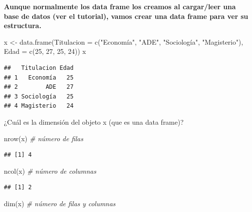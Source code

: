 \documentclass[
]{book}
\newenvironment{Shaded}{\begin{snugshade}}{\end{snugshade}}
\newcommand{\AttributeTok}[1]{\textcolor[rgb]{0.77,0.63,0.00}{#1}}
\newcommand{\CommentTok}[1]{\textcolor[rgb]{0.56,0.35,0.01}{\textit{#1}}}
\newcommand{\DecValTok}[1]{\textcolor[rgb]{0.00,0.00,0.81}{#1}}
\newcommand{\FunctionTok}[1]{\textcolor[rgb]{0.00,0.00,0.00}{#1}}
\newcommand{\NormalTok}[1]{#1}
\newcommand{\OtherTok}[1]{\textcolor[rgb]{0.56,0.35,0.01}{#1}}
\newcommand{\StringTok}[1]{\textcolor[rgb]{0.31,0.60,0.02}{#1}}
\begin{document}
\textbf{Aunque normalmente los data frame los creamos al cargar/leer una base de datos (ver el tutorial), vamos crear una data frame para ver su estructura.}

\begin{Shaded}
\begin{Highlighting}[]
\NormalTok{x }\OtherTok{\textless{}{-}} \FunctionTok{data.frame}\NormalTok{(}\AttributeTok{Titulacion =} \FunctionTok{c}\NormalTok{(}\StringTok{"Economía"}\NormalTok{, }\StringTok{"ADE"}\NormalTok{, }\StringTok{"Sociología"}\NormalTok{, }\StringTok{"Magisterio"}\NormalTok{), }\AttributeTok{Edad =} \FunctionTok{c}\NormalTok{(}\DecValTok{25}\NormalTok{, }\DecValTok{27}\NormalTok{, }\DecValTok{25}\NormalTok{, }\DecValTok{24}\NormalTok{))}
\NormalTok{x}
\end{Highlighting}
\end{Shaded}

\begin{verbatim}
##   Titulacion Edad
## 1   Economía   25
## 2        ADE   27
## 3 Sociología   25
## 4 Magisterio   24
\end{verbatim}

¿Cuál es la dimensión del objeto x (que es una data frame)?

\begin{Shaded}
\begin{Highlighting}[]
\FunctionTok{nrow}\NormalTok{(x) }\CommentTok{\# número de filas}
\end{Highlighting}
\end{Shaded}

\begin{verbatim}
## [1] 4
\end{verbatim}

\begin{Shaded}
\begin{Highlighting}[]
\FunctionTok{ncol}\NormalTok{(x) }\CommentTok{\# número de columnas}
\end{Highlighting}
\end{Shaded}

\begin{verbatim}
## [1] 2
\end{verbatim}

\begin{Shaded}
\begin{Highlighting}[]
\FunctionTok{dim}\NormalTok{(x)  }\CommentTok{\# número de filas y columnas}
\end{Highlighting}
\end{Shaded}
\end{document}
